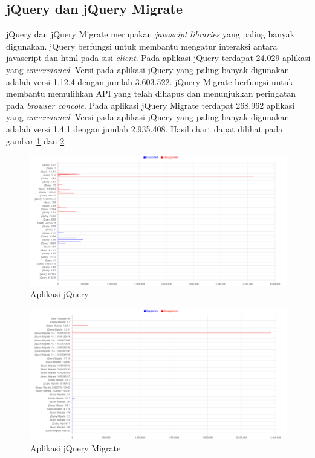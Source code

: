 \subsection{jQuery dan jQuery Migrate}
jQuery dan jQuery Migrate merupakan \textit{javascipt libraries} yang paling banyak digunakan. jQuery berfungsi untuk membantu mengatur interaksi antara javascript dan html pada sisi \textit{client}. Pada aplikasi jQuery terdapat 24.029 aplikasi yang \textit{unversioned}. Versi pada aplikasi jQuery yang paling banyak digunakan adalah versi 1.12.4 dengan jumlah 3.603.522. jQuery Migrate berfungsi untuk membantu memulihkan API yang telah dihapus dan menunjukkan peringatan pada \textit{browser concole}. Pada aplikasi jQuery Migrate terdapat 268.962 aplikasi yang \textit{unversioned}. Versi pada aplikasi jQuery yang paling banyak digunakan adalah versi 1.4.1 dengan jumlah 2.935.408. Hasil chart dapat dilihat pada gambar \ref{fig:data_sample_jQuery} dan  \ref{fig:data_sample_jQuery_migrate}
\begin{figure}[H]
	\centering  
	\includegraphics[scale=0.5]{Gambar/hasil_chart_jQuery.png}  
	\caption{Aplikasi jQuery} 
	\label{fig:data_sample_jQuery} 
\end{figure}

\begin{figure}[H]
	\centering  
	\includegraphics[scale=0.5]{Gambar/hasil_chart_jQuery_migrate.png}  
	\caption{Aplikasi jQuery Migrate} 
	\label{fig:data_sample_jQuery_migrate} 
\end{figure}
